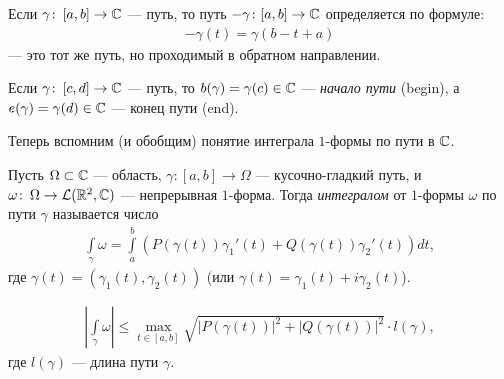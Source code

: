 \documentclass[../complex-analysis.tex]{subfiles}
\begin{document}
\begin{notatn*}
 Если $\gamma \colon\, [a,b] \to \mathbb{C}$ --- путь, то путь $-\gamma \colon [a,b] \to \mathbb{C}$ определяется по формуле:
 \begin{align*}
  -\gamma(t) = \gamma(b - t + a)
 \end{align*} --- это тот же путь, но проходимый в обратном направлении.
\end{notatn*}
\begin{notatn*}
 Если $\gamma \colon\, [c, d] \to \mathbb{C}$ --- путь, то $b(\gamma) = \gamma(c) \in \mathbb{C}$ --- \textit{начало пути} (begin), а $e(\gamma) = \gamma(d) \in \mathbb{C}$ --- конец пути (end).
\end{notatn*}

Теперь вспомним (и обобщим) понятие интеграла $1$-формы по пути в $\mathbb{C}$.

\begin{df}
 Пусть $\Omega \subset \mathbb{C}$ --- область, $\gamma \colon [a,b] \to \Omega$ --- кусочно-гладкий путь, и $\omega \colon\, \Omega \to \mathcal{L}(\mathbb{R}^2, \mathbb{C})$ --- непрерывная $1$-форма. Тогда \textit{интегралом} от $1$-формы $\omega$ по пути  $\gamma$ называется число
 \begin{align*}
  \int\limits_{\gamma} \omega = \int\limits_{a}^{b} \left( P(\gamma(t)) \gamma_1'(t) + Q(\gamma(t)) \gamma_2'(t) \right) dt,
 \end{align*} где $\gamma(t) = (\gamma_1(t),\gamma_2(t))$ (или $\gamma(t) = \gamma_1(t) + i \gamma_2(t)$).
\end{df}
\begin{lm}
 \begin{align*}
  \left| \int\limits_{\gamma} \omega  \right| \leqslant \max_{t \in [a,b]} \sqrt{\left| P(\gamma(t)) \right|^{2} + \left| Q(\gamma(t)) \right|^{2}} \cdot l(\gamma),
 \end{align*} где $l(\gamma)$ --- длина пути $\gamma$.
\end{lm}
\end{document}
